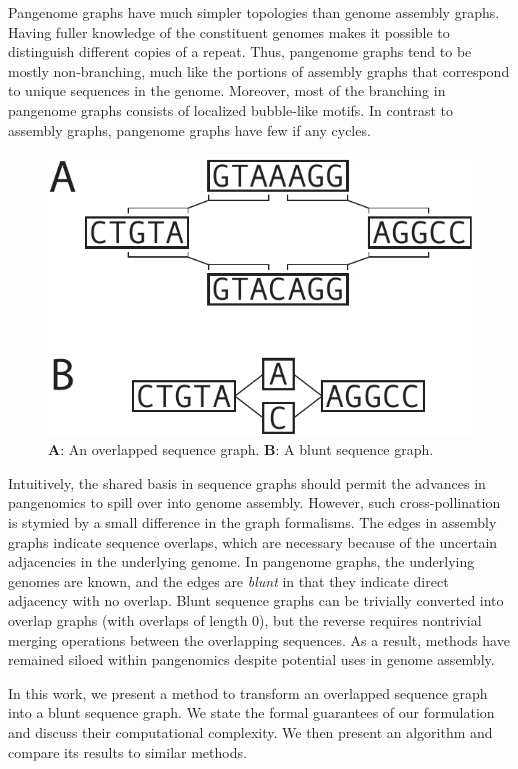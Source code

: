 \documentclass[11pt]{ucthesis}
\begin{document}
Pangenome graphs have much simpler topologies than genome assembly graphs.
Having fuller knowledge of the constituent genomes makes it possible to distinguish different copies of a repeat.
Thus, pangenome graphs tend to be mostly non-branching, much like the portions of assembly graphs that correspond to unique sequences in the genome.
Moreover, most of the branching in pangenome graphs consists of localized bubble-like motifs.
In contrast to assembly graphs, pangenome graphs have few if any cycles.

\begin{figure}
\begin{center}
\includegraphics[width=.5\textwidth]{bluntfigures/overlap_vs_blunt.pdf}
\caption{\textbf{A}: An overlapped sequence graph. \textbf{B}: A blunt sequence graph.} \label{fig:seqgraphs}
\end{center}
\end{figure}

Intuitively, the shared basis in sequence graphs should permit the advances in pangenomics to spill over into genome assembly.
However, such cross-pollination is stymied by a small difference in the graph formalisms.
The edges in assembly graphs indicate sequence overlaps, which are necessary because of the uncertain adjacencies in the underlying genome.
In pangenome graphs, the underlying genomes are known, and the edges are \emph{blunt} in that they indicate direct adjacency with no overlap.
Blunt sequence graphs can be trivially converted into overlap graphs (with overlaps of length 0), but the reverse requires nontrivial merging operations between the overlapping sequences.
As a result, methods have remained siloed within pangenomics despite potential uses in genome assembly.

In this work, we present a method to transform an overlapped sequence graph into a blunt sequence graph. 
We state the formal guarantees of our formulation and discuss their computational complexity. 
We then present an algorithm and compare its results to similar methods.
\end{document}
